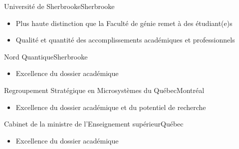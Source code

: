 {Université de Sherbrooke}{Sherbrooke}
{\vspace{-12pt}
\begin{itemize}
    \item Plus haute distinction que la Faculté de génie remet à des étudiant(e)s
    \item Qualité et quantité des accomplissements académiques et professionnels
\end{itemize}}

{Nord Quantique}{Sherbrooke}
{\vspace{-12pt}
\begin{itemize}
    \item Excellence du dossier académique
\end{itemize}}

{Regroupement Stratégique en Microsystèmes du Québec}{Montréal}
{\vspace{-12pt}
\begin{itemize}
    \item Excellence du dossier académique et du potentiel de recherche
\end{itemize}}

{Cabinet de la ministre de l'Enseignement supérieur}{Québec}
{\vspace{-12pt}
\begin{itemize}
    \item Excellence du dossier académique
\end{itemize}}
